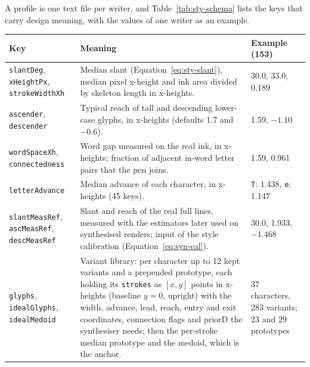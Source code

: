 

A profile is one text file per writer, and Table~\ref{tab:sty-schema} lists the keys that carry design meaning, with the values of one writer as an example.

\begin{table}[!htbp]
\centering
\fontsize{7.5}{9}\selectfont
\setlength{\tabcolsep}{3pt}
\renewcommand{\arraystretch}{1.05}
\begin{tabularx}{\linewidth}{|p{2.6cm}|X|p{2.1cm}|}
\hline
\textbf{Key} & \textbf{Meaning} & \textbf{Example (153)} \\
\hline
\texttt{slantDeg}, \texttt{xHeightPx}, \texttt{strokeWidthXh} & Median slant (Equation~\ref{eq:sty-slant}), median pixel x-height and ink area divided by skeleton length in x-heights. & 30.0, 33.0, 0.189 \\
\hline
\texttt{ascender}, \texttt{descender} & Typical reach of tall and descending lower-case glyphs, in x-heights (defaults 1.7 and $-0.6$). & 1.59, $-1.10$ \\
\hline
\texttt{wordSpaceXh}, \texttt{connectedness} & Word gap measured on the real ink, in x-heights; fraction of adjacent in-word letter pairs that the pen joins. & 1.59, 0.961 \\
\hline
\texttt{letterAdvance} & Median advance of each character, in x-heights (45 keys). & \texttt{T}: 1.438, \texttt{e}: 1.147 \\
\hline
\texttt{slantMeasRef}, \texttt{ascMeasRef}, \texttt{descMeasRef} & Slant and reach of the real full lines, measured with the estimators later used on synthesised renders; input of the style calibration (Equation~\ref{eq:syn-cal}). & 30.0, 1.933, $-1.468$ \\
\hline
\texttt{glyphs}, \texttt{idealGlyphs}, \texttt{idealMedoid} & Variant library: per character up to 12 kept variants and a prepended prototype, each holding its \texttt{strokes} as $[x,y]$ points in x-heights (baseline $y=0$, upright) with the width, advance, lead, reach, entry and exit coordinates, connection flags and $\mathrm{priorD}$ the synthesiser needs; then the per-stroke median prototype and the medoid, which is the anchor. & 37 characters, 283 variants; 23 and 29 prototypes \\

\end{tabularx}
\end{table}
